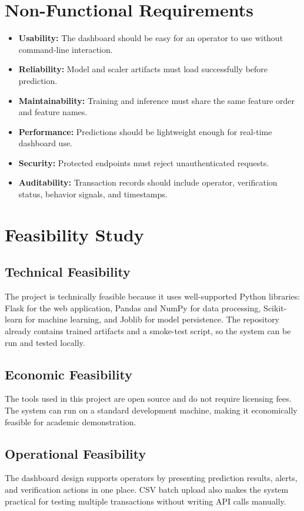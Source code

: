 \documentclass[12pt,a4paper]{report}
\begin{document}
\section{Non-Functional Requirements}
\begin{itemize}
    \item \textbf{Usability:} The dashboard should be easy for an operator to use without command-line interaction.
    \item \textbf{Reliability:} Model and scaler artifacts must load successfully before prediction.
    \item \textbf{Maintainability:} Training and inference must share the same feature order and feature names.
    \item \textbf{Performance:} Predictions should be lightweight enough for real-time dashboard use.
    \item \textbf{Security:} Protected endpoints must reject unauthenticated requests.
    \item \textbf{Auditability:} Transaction records should include operator, verification status, behavior signals, and timestamps.
\end{itemize}

\section{Feasibility Study}
\subsection{Technical Feasibility}
The project is technically feasible because it uses well-supported Python libraries: Flask for the web application, Pandas and NumPy for data processing, Scikit-learn for machine learning, and Joblib for model persistence. The repository already contains trained artifacts and a smoke-test script, so the system can be run and tested locally.

\subsection{Economic Feasibility}
The tools used in this project are open source and do not require licensing fees. The system can run on a standard development machine, making it economically feasible for academic demonstration.

\subsection{Operational Feasibility}
The dashboard design supports operators by presenting prediction results, alerts, and verification actions in one place. CSV batch upload also makes the system practical for testing multiple transactions without writing API calls manually.
\end{document}
